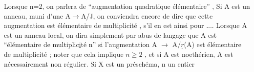 Lorsque n=2, on parlera de ``augmentation  quadratique élémentaire'' ,
Si A est un anneau,  muni d'une  A$\to$A/J,
on conviendra encore de dire que cette augmentation est élémentaire de
multiplicité  , s'il en est ainsi pour .... Lorsque A est un anneau
local, on dira simplement par abus de langage que A est ``élémentaire de
multiplic\uline{i}té n'' si l'augmentation A $\to$ A/$\underline{r}$(A) est élémentaire de
multiplicité ; noter que cela implique $n \geqslant 2$ , et si A est noethérien,
A est nécessairement non régulier. Si X est un préschéma, n un entier

